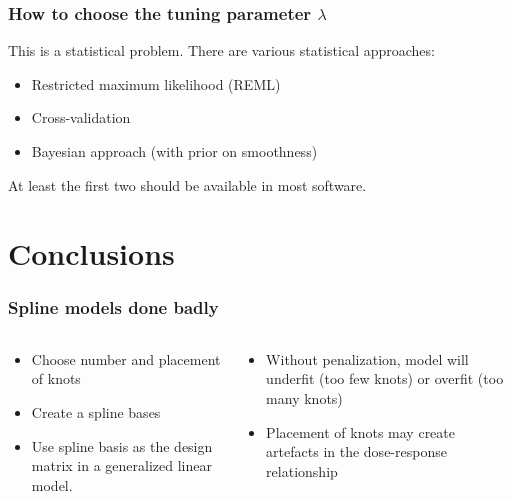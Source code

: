 \documentclass[aspectratio=169]{beamer}
\begin{document}
\begin{frame}
  \frametitle{How to choose the tuning parameter $\lambda$}

  This is a statistical problem. There are various statistical
  approaches:
  \begin{itemize}
  \item Restricted maximum likelihood (REML)
  \item Cross-validation
  \item Bayesian approach (with prior on smoothness)
  \end{itemize}
  At least the first two should be available in most software.
  
\end{frame}

\section{Conclusions}

\begin{frame}
  \frametitle{Spline models done badly}

  \begin{columns}
    \begin{column}{5cm}
      \begin{itemize}
      \item Choose number and placement of knots
      \item Create a spline bases
      \item Use spline basis as the design matrix in a generalized linear model.
      \end{itemize}
    \end{column}
    \begin{column}{5cm}
      \begin{itemize}
      \item Without penalization, model will underfit (too few knots)
        or overfit (too many knots)
      \item Placement of knots may create artefacts in the dose-response
        relationship
      \end{itemize}
    \end{column}
  \end{columns}

\end{frame}
\end{document}
